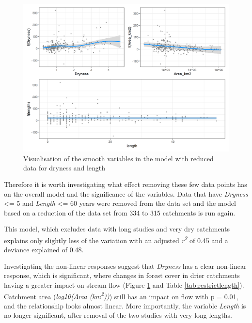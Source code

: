 \documentclass[]{elsarticle} %
\begin{document}
\begin{figure}
\includegraphics[width=0.9\linewidth]{model_redLength_smooths} \caption{Visualisation of the smooth variables in the model with reduced data for dryness and length}\label{fig:smoothsmodelredLength}
\end{figure}

Therefore it is worth investigating what effect removing these few data points has on the overall model and the significance of the variables. Data that have \emph{Dryness} \textless= 5 and \emph{Length} \textless= 60 years were removed from the data set and the model based on a reduction of the data set from 334 to 315 catchments is run again.

This model, which excludes data with long studies and very dry catchments explains only slightly less of the variation with an adjusted \emph{r\textsuperscript{2}} of 0.45 and a deviance explained of 0.48.

Investigating the non-linear responses suggest that \emph{Dryness} has a clear non-linear response, which is significant, where changes in forest cover in drier catchments having a greater impact on stream flow (Figure \ref{fig:smoothsmodelredLength} and Table \ref{tab:restrictlength}). Catchment area (\emph{log10(Area (km\textsuperscript{2}))}) still has an impact on flow with p = 0.01, and the relationship looks almost linear. More importantly, the variable \emph{Length} is no longer significant, after removal of the two studies with very long lengths.
\end{document}
